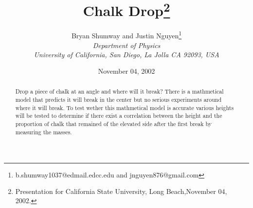 \documentclass{article}
\begin{document}
\title{Chalk Drop\footnote{
Presentation for California State University, Long Beach,November
04, 2002.}}
\author{Bryan Shumway and Justin Nguyen\thanks{b.shumway1037@edmail.edcc.edu and jnguyen876@gmail.com}\vspace{10pt}\\
{\em Department of Physics}\\
{\em University of California, San Diego, La Jolla CA 92093, USA}}
\date{November 04, 2002}

\maketitle

\thispagestyle{empty}

\begin{abstract}
Drop a piece of chalk at an angle and where will it break? There is a mathmetical model that predicts it will break in the center but no serious experiments around where it will break. To test wether this mathmetical model is accurate various heights will be tested to determine if there exist a correlation between the height and the proportion of chalk that remained of the elevated side after the first break by measuring the masses. 
\end{abstract}
\end{document}
